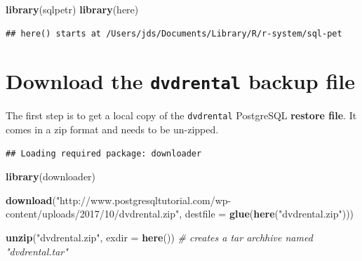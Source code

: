 \documentclass[]{book}
\newenvironment{Shaded}{\begin{snugshade}}{\end{snugshade}}
\newcommand{\CommentTok}[1]{\textcolor[rgb]{0.56,0.35,0.01}{\textit{#1}}}
\newcommand{\ControlFlowTok}[1]{\textcolor[rgb]{0.13,0.29,0.53}{\textbf{#1}}}
\newcommand{\DataTypeTok}[1]{\textcolor[rgb]{0.13,0.29,0.53}{#1}}
\newcommand{\KeywordTok}[1]{\textcolor[rgb]{0.13,0.29,0.53}{\textbf{#1}}}
\newcommand{\NormalTok}[1]{#1}
\newcommand{\OperatorTok}[1]{\textcolor[rgb]{0.81,0.36,0.00}{\textbf{#1}}}
\newcommand{\StringTok}[1]{\textcolor[rgb]{0.31,0.60,0.02}{#1}}
\theoremstyle{definition}
\theoremstyle{definition}
\theoremstyle{definition}
\theoremstyle{remark}
\begin{document}
\begin{Shaded}
\begin{Highlighting}[]
\KeywordTok{library}\NormalTok{(sqlpetr)}
\KeywordTok{library}\NormalTok{(here)}
\end{Highlighting}
\end{Shaded}

\begin{verbatim}
## here() starts at /Users/jds/Documents/Library/R/r-system/sql-pet
\end{verbatim}

\hypertarget{download-the-dvdrental-backup-file}{%
\section{\texorpdfstring{Download the \texttt{dvdrental} backup
file}{Download the dvdrental backup file}}\label{download-the-dvdrental-backup-file}}

The first step is to get a local copy of the \texttt{dvdrental}
PostgreSQL \textbf{restore file}. It comes in a zip format and needs to
be un-zipped.

\begin{Shaded}
\end{Shaded}

\begin{verbatim}
## Loading required package: downloader
\end{verbatim}

\begin{Shaded}
\begin{Highlighting}[]
\KeywordTok{library}\NormalTok{(downloader)}

\KeywordTok{download}\NormalTok{(}\StringTok{"http://www.postgresqltutorial.com/wp-content/uploads/2017/10/dvdrental.zip"}\NormalTok{, }\DataTypeTok{destfile =} \KeywordTok{glue}\NormalTok{(}\KeywordTok{here}\NormalTok{(}\StringTok{"dvdrental.zip"}\NormalTok{)))}

\KeywordTok{unzip}\NormalTok{(}\StringTok{"dvdrental.zip"}\NormalTok{, }\DataTypeTok{exdir =} \KeywordTok{here}\NormalTok{()) }\CommentTok{# creates a tar archhive named "dvdrental.tar"}
\end{Highlighting}
\end{Shaded}
\end{document}
